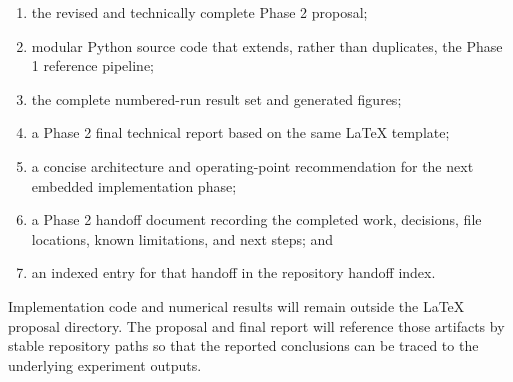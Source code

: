 \begin{enumerate}
    \item the revised and technically complete Phase 2 proposal;
    \item modular Python source code that extends, rather than duplicates, the Phase 1 reference pipeline;
    \item the complete numbered-run result set and generated figures;
    \item a Phase 2 final technical report based on the same LaTeX template;
    \item a concise architecture and operating-point recommendation for the next embedded implementation phase;
    \item a Phase 2 handoff document recording the completed work, decisions, file locations, known limitations, and next steps; and
    \item an indexed entry for that handoff in the repository handoff index.
\end{enumerate}

Implementation code and numerical results will remain outside the LaTeX proposal directory. The proposal and final report will reference those artifacts by stable repository paths so that the reported conclusions can be traced to the underlying experiment outputs.